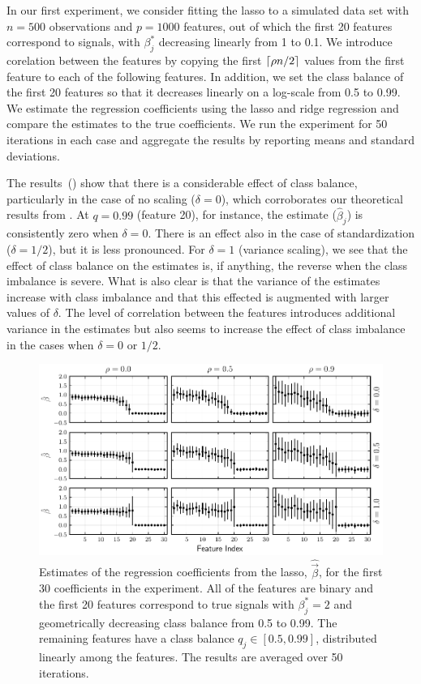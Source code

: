 In our first experiment, we consider fitting the lasso to a simulated data set with \(n=500\) observations and \(p = \num{1000}\) features, out of which the first 20 features correspond to signals, with \(\beta_j^*\) decreasing linearly from 1 to 0.1.
We introduce corelation between the features by copying the first \(\lceil \rho n/2 \rceil\) values from the first feature to each of the following features.
In addition, we set the class balance of the first 20 features so that it decreases linearly on a log-scale from 0.5 to 0.99.
We estimate the regression coefficients using the lasso and ridge regression and compare the estimates to the true coefficients. We run the experiment for 50 iterations in each case and aggregate the results by reporting means and standard deviations.

The results~() show that there is a considerable effect of class balance, particularly in the case of no scaling (\(\delta = 0\)), which corroborates our theoretical results from . At \(q=0.99\) (feature 20), for instance, the estimate (\(\hat{\beta}_j\)) is consistently zero when \(\delta = 0\). There is an effect also in the case of standardization (\(\delta = 1/2\)), but it is less pronounced. For \(\delta=1\) (variance scaling), we see that the effect of class balance on the estimates is, if anything, the reverse when the class imbalance is severe. What is also clear is that the variance of the estimates increase with class imbalance and that this effected is augmented with larger values of \(\delta\). The level of correlation between the features introduces additional variance in the estimates but also seems to increase the effect of class imbalance in the cases when \(\delta = 0\) or \(1/2\).

\begin{figure}[htpb]
  \centering
  \includegraphics[]{plots/binary_decreasing.pdf}
  \caption{%
    Estimates of the regression coefficients from the lasso, \(\hat{\vec{\beta}}\), for the first 30 coefficients in the experiment. All of the features are binary and the first 20 features correspond to true signals with \(\beta_j^* = 2\) and geometrically decreasing class balance from 0.5 to 0.99. The remaining features have a class balance \(q_j \in [0.5, 0.99]\), distributed linearly among the features. The results are averaged over 50 iterations.}
  \label{fig:binary-decreasing}
\end{figure}

